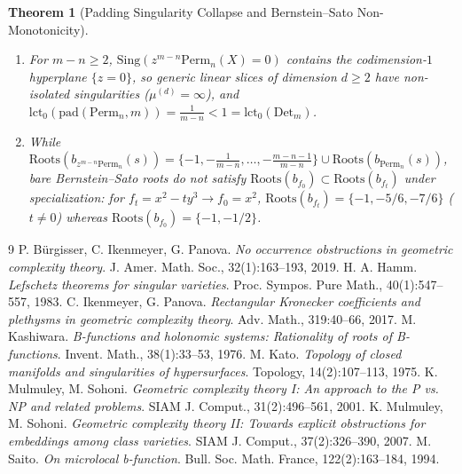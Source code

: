 \documentclass[11pt,a4paper]{article}
\newtheorem{theorem}{Theorem}[section]
\theoremstyle{definition}
\begin{document}
\begin{theorem}[Padding Singularity Collapse and Bernstein--Sato Non-Monotonicity]
\label{thm:bs}
\begin{enumerate}
    \item For $m - n \ge 2$, $\text{Sing}(z^{m-n}\text{Perm}_n(X) = 0)$ contains the codimension-$1$ hyperplane $\{z=0\}$, so generic linear slices of dimension $d \ge 2$ have non-isolated singularities ($\mu^{(d)} = \infty$), and $\text{lct}_0(\text{pad}(\text{Perm}_n, m)) = \frac{1}{m-n} < 1 = \text{lct}_0(\text{Det}_m)$.
    \item While $\text{Roots}(b_{z^{m-n}\text{Perm}_n}(s)) = \{-1, -\frac{1}{m-n}, \dots, -\frac{m-n-1}{m-n}\} \cup \text{Roots}(b_{\text{Perm}_n}(s))$, bare Bernstein--Sato roots do not satisfy $\text{Roots}(b_{f_0}) \subset \text{Roots}(b_{f_t})$ under specialization: for $f_t = x^2 - ty^3 \to f_0 = x^2$, $\text{Roots}(b_{f_t}) = \{-1, -5/6, -7/6\}$ ($t \neq 0$) whereas $\text{Roots}(b_{f_0}) = \{-1, -1/2\}$.
\end{enumerate}
\end{theorem}

\begin{thebibliography}{9}
 P. B\"urgisser, C. Ikenmeyer, G. Panova. \emph{No occurrence obstructions in geometric complexity theory}. J. Amer. Math. Soc., 32(1):163--193, 2019.
 H. A. Hamm. \emph{Lefschetz theorems for singular varieties}. Proc. Sympos. Pure Math., 40(1):547--557, 1983.
 C. Ikenmeyer, G. Panova. \emph{Rectangular Kronecker coefficients and plethysms in geometric complexity theory}. Adv. Math., 319:40--66, 2017.
 M. Kashiwara. \emph{B-functions and holonomic systems: Rationality of roots of B-functions}. Invent. Math., 38(1):33--53, 1976.
 M. Kato. \emph{Topology of closed manifolds and singularities of hypersurfaces}. Topology, 14(2):107--113, 1975.
 K. Mulmuley, M. Sohoni. \emph{Geometric complexity theory I: An approach to the P vs. NP and related problems}. SIAM J. Comput., 31(2):496--561, 2001.
 K. Mulmuley, M. Sohoni. \emph{Geometric complexity theory II: Towards explicit obstructions for embeddings among class varieties}. SIAM J. Comput., 37(2):326--390, 2007.
 M. Saito. \emph{On microlocal b-function}. Bull. Soc. Math. France, 122(2):163--184, 1994.
\end{thebibliography}
\end{document}
